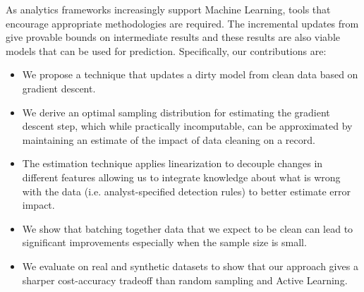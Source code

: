 As analytics frameworks increasingly support Machine Learning, tools that encourage appropriate methodologies are required.
The incremental updates from \sys give provable bounds on intermediate results and these results are also viable models that can be used for prediction. 
Specifically, our contributions are:
\begin{itemize}[noitemsep]
\item We propose a technique that updates a dirty model from clean data based on gradient descent.
\item We derive an optimal sampling distribution for estimating the gradient descent step, which while practically incomputable, can be approximated by maintaining an estimate of the impact of data cleaning on a record. 
\item The estimation technique applies linearization to decouple changes in different features allowing us to integrate knowledge about what is wrong with the data (i.e. analyst-specified detection rules) to better estimate error impact.
\item We show that batching together data that we expect to be clean can lead to significant improvements especially when the sample size is small.
\item We evaluate \sysfull on real and synthetic datasets to show that our approach gives a sharper cost-accuracy tradeoff than random sampling and Active Learning.
\end{itemize}






